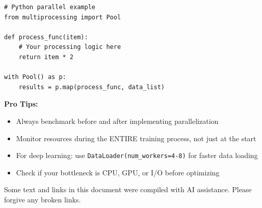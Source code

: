 \documentclass[11pt,a4paper]{article}
\begin{document}
\begin{lstlisting}[style=pythonstyle, caption=Python Parallel Processing Example]
# Python parallel example
from multiprocessing import Pool

def process_func(item):
    # Your processing logic here
    return item * 2

with Pool() as p:
    results = p.map(process_func, data_list)
\end{lstlisting}

\textbf{Pro Tips:}
\begin{itemize}
    \item Always benchmark before and after implementing parallelization
    \item Monitor resources during the ENTIRE training process, not just at the start
    \item For deep learning: use \texttt{DataLoader(num\_workers=4-8)} for faster data loading
    \item Check if your bottleneck is CPU, GPU, or I/O before optimizing
\end{itemize}

\vspace{1cm}
\begin{tcolorbox}[colback=gray!10,colframe=gray!50,title=AI Disclosure]
Some text and links in this document were compiled with AI assistance. Please forgive any broken links.
\end{tcolorbox}
\end{document}
